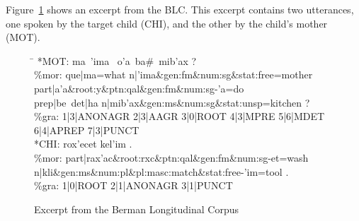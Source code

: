 

Figure~\ref{fig:excerpt} shows an excerpt from the \ac{BLC}. This excerpt contains
two utterances, one spoken by the target child (CHI), and the other
by the child's mother (MOT).
\begin{figure}[ht]
\vspace{10pt}
\label{fig:excerpt}
\caption{Excerpt from the Berman Longitudinal Corpus}
\vspace{-12pt}\begin{tabbing}
\small
\hspace{0.6in} \= \hspace{5.5in} \kill
\textsf{*MOT:} \> \textsf{ma\, \a'{i}ma \,
o\a'{a}\, ba\#\, mib\a'{a}x ?} \\
\textsf{\%mor:} \> \textsf{que|ma=what n|\a'{i}ma\&gen:fm\&num:sg\&stat:free=mother} \\
 \> \textsf{part|a\a'{a}\&root:y\&ptn:qal\&gen:fm\&num:sg-\a'{a}=do} \\
   \> \textsf{prep|be~det|ha n|mib\a'{a}x\&gen:ms\&num:sg\&stat:unsp=kitchen ?}\\
\textsf{\%gra:} \>	\textsf{1|3|ANONAGR 2|3|AAGR 3|0|ROOT 4|3|MPRE 5|6|MDET 6|4|APREP 7|3|PUNCT}\\
\textsf{*\ac{CH}I:} \> \textsf{rox\a'{e}cet kel\a'{i}m .}\\
\textsf{\%mor:} \> \textsf{part|rax\a'{a}c\&root:rxc\&ptn:qal\&gen:fm\&num:sg-et=wash} \\
    \>  \textsf{n|kli}\&\textsf{gen:ms\&num:pl\&pl:masc:match\&stat:free-\a'{i}m=tool .} \\ 
\textsf{\%gra:} \> \textsf{1|0|ROOT 2|1|ANONAGR 3|1|PUNCT}
\end{tabbing}
\end{figure}


